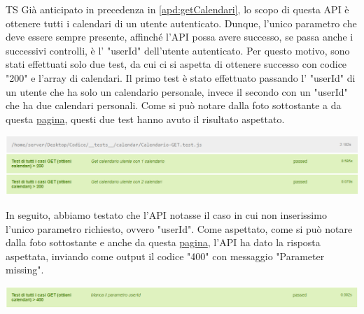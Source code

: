 \begin{listaPersonale}{TS}
                Già anticipato in precedenza in \ref{apd:getCalendari}, lo scopo di questa API è ottenere tutti i calendari di un utente autenticato. Dunque, l'unico parametro che deve essere sempre presente, affinché l'API possa avere successo, se passa anche i successivi controlli, è l' "userId" dell'utente autenticato. Per questo motivo, sono stati effettuati solo due test, da cui ci si aspetta di ottenere successo con codice "200" e l'array di calendari. Il primo test è stato effettuato passando l' "userId" di un utente che ha solo un calendario personale, invece il secondo con un "userId" che ha due calendari personali. Come si può notare dalla foto sottostante a da questa \href{https://plan-it.it/test-report.html} {pagina}, questi due test hanno avuto il risultato aspettato.
                \begin{center}
                        \includegraphics[width=1\textwidth, height=0.115\textheight]{img/png/tests/CalendarioGet/200_getCalendari.png}
                \end{center}
                In seguito, abbiamo testato che l'API notasse il caso in cui non inserissimo l'unico parametro richiesto, ovvero "userId". Come aspettato, come si può notare dalla foto sottostante e anche da questa \href{https://plan-it.it/test-report.html} {pagina}, l'API ha dato la risposta aspettata, inviando come output il codice "400" con messaggio "Parameter missing".
                \begin{center}
                        \includegraphics[width=1\textwidth, height=0.045\textheight]{img/png/tests/CalendarioGet/400_getCalendari.png}

\end{center}
\end{listaPersonale}
